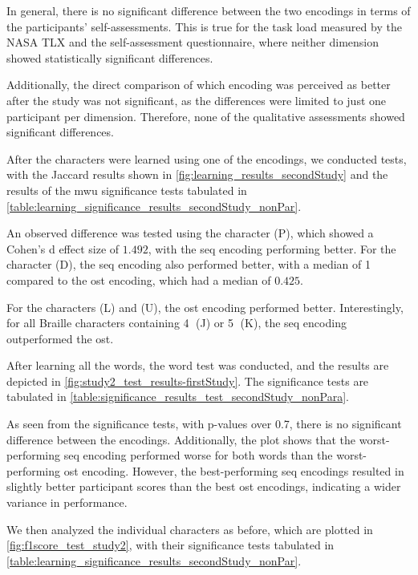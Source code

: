 In general, there is no significant difference between the two encodings in terms of the participants' self-assessments. This is true for the task load measured by the NASA TLX and the self-assessment questionnaire, where neither dimension showed statistically significant differences.

Additionally, the direct comparison of which encoding was perceived as better after the study was not significant, as the differences were limited to just one participant per dimension. Therefore, none of the qualitative assessments showed significant differences.

After the characters were learned using one of the encodings, we conducted tests, with the Jaccard results shown in \autoref{fig:learning_results_secondStudy} and the results of the \gls{mwu} significance tests tabulated in \autoref{table:learning_significance_results_secondStudy_nonPar}.

An observed difference was tested using the character (P), which showed a Cohen's d effect size of $1.492$, with the \gls{seq} encoding performing better. For the character (D), the \gls{seq} encoding also performed better, with a median of 1 compared to the \gls{ost} encoding, which had a median of $0.425$.

For the characters (L) and (U), the \gls{ost} encoding performed better. Interestingly, for all Braille characters containing \textcircled{4} (J) or \textcircled{5} (K), the \gls{seq} encoding outperformed the \gls{ost}.


After learning all the words, the word test was conducted, and the results are depicted in \autoref{fig:study2_test_results-firstStudy}. The significance tests are tabulated in \autoref{table:significance_results_test_secondStudy_nonPara}.

As seen from the significance tests, with p-values over 0.7, there is no significant difference between the encodings. Additionally, the plot shows that the worst-performing \gls{seq} encoding performed worse for both words than the worst-performing \gls{ost} encoding. However, the best-performing \gls{seq} encodings resulted in slightly better participant scores than the best \gls{ost} encodings, indicating a wider variance in performance.

We then analyzed the individual characters as before, which are plotted in \autoref{fig:f1score_test_study2}, with their significance tests tabulated in \autoref{table:learning_significance_results_secondStudy_nonPar}.

